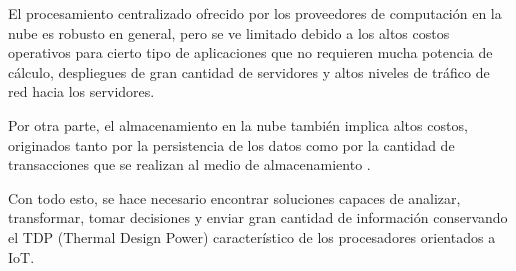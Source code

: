 El procesamiento centralizado ofrecido por los proveedores de computación en la nube es robusto en general, pero se ve limitado debido a los altos costos operativos para cierto tipo de  aplicaciones que no requieren mucha potencia de cálculo, despliegues de gran cantidad de servidores y altos niveles de tráfico de red hacia los servidores.

Por otra parte, el almacenamiento en la nube también implica altos costos, originados tanto por la persistencia de los datos como por la cantidad de transacciones que se realizan al medio de almacenamiento \citep{AzurePrice,AWSPrice,GCPrice,UPrice}.

Con todo esto, se hace necesario encontrar soluciones capaces de  analizar, transformar, tomar decisiones y enviar gran cantidad de información conservando el TDP (Thermal Design Power) característico de los procesadores orientados a IoT.
